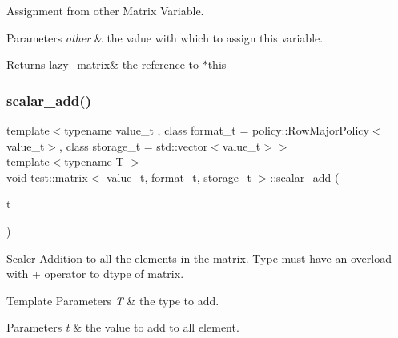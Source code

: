 Assignment from other Matrix Variable. 


\begin{DoxyParams}{Parameters}
{\em other} & the value with which to assign this variable. \\
\hline
\end{DoxyParams}
\begin{DoxyReturn}{Returns}
lazy\+\_\+matrix\& the reference to $\ast$this 
\end{DoxyReturn}
\mbox{\label{classtest_1_1matrix_a0bb59ea5c15a548758863aa46b291219}} 
\subsubsection{\texorpdfstring{scalar\_add()}{scalar\_add()}}
{\footnotesize\ttfamily template$<$typename value\+\_\+t , class format\+\_\+t  = policy\+::\+Row\+Major\+Policy$<$value\+\_\+t$>$, class storage\+\_\+t  = std\+::vector$<$value\+\_\+t$>$$>$ \\
template$<$typename T $>$ \\
void \mbox{\hyperlink{classtest_1_1matrix}{test\+::matrix}}$<$ value\+\_\+t, format\+\_\+t, storage\+\_\+t $>$\+::scalar\+\_\+add (\begin{DoxyParamCaption}\item[{T}]{t }\end{DoxyParamCaption})\hspace{0.3cm}{\ttfamily [inline]}}



Scaler Addition to all the elements in the matrix. Type must have an overload with + operator to dtype of matrix. 


\begin{DoxyTemplParams}{Template Parameters}
{\em T} & the type to add. \\
\hline
\end{DoxyTemplParams}

\begin{DoxyParams}{Parameters}
{\em t} & the value to add to all element. \\
\hline
\end{DoxyParams}
\mbox{\label{classtest_1_1matrix_a5c36fb88feb075b3302575914d3de483}} 
